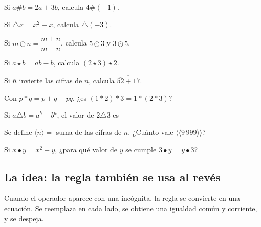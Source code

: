 \taller
{}
\begin{ejercicios}
\item Si $a \# b = 2a + 3b$, calcula $4 \# (-1)$. 
\item Si $\triangle x = x^2 - x$, calcula $\triangle(-3)$. 
\item Si $m \odot n = \dfrac{m + n}{m - n}$, calcula $5 \odot 3$ y $3 \odot 5$. 
\end{ejercicios}
\begin{ejercicios}
\item Si $a \star b = ab - b$, calcula $(2 \star 3) \star 2$. 
\item Si $\overline{n}$ invierte las cifras de $n$, calcula $\overline{\overline{52} + 17}$. 
\item Con $p \ast q = p + q - pq$, ¿es $(1 \ast 2) \ast 3 = 1 \ast (2 \ast 3)$? 
\end{ejercicios}
\begin{ejercicios}
\item Si $a \triangle b = a^b - b^a$, el valor de $2 \triangle 3$ es
\item Se define $\langle n \rangle = $ suma de las cifras de $n$. ¿Cuánto vale $\langle\langle 9\,999 \rangle\rangle$?
\item Si $x \bullet y = x^2 + y$, ¿para qué valor de $y$ se cumple $3 \bullet y = y \bullet 3$?
\end{ejercicios}

\bitacora


\subsection{La idea: la regla también se usa al revés}
Cuando el operador aparece con una incógnita, la regla se convierte en una ecuación. Se reemplaza en cada lado, se
obtiene una igualdad común y corriente, y se despeja.

